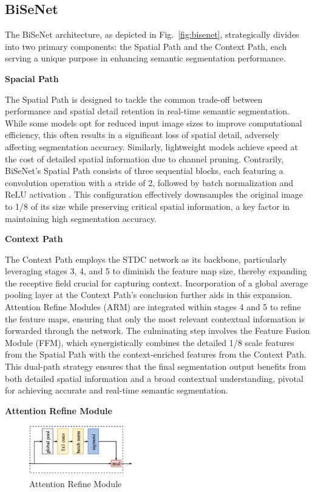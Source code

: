 \documentclass[conference]{IEEEtran}
\begin{document}
\subsection{BiSeNet}

The BiSeNet architecture, as depicted in Fig.~\ref{fig:bisenet}, strategically divides into two primary components: the Spatial Path and the Context Path, each serving a unique purpose in enhancing semantic segmentation performance.

\textbf{Spacial Path}

The Spatial Path is designed to tackle the common trade-off between performance and spatial detail retention in real-time semantic segmentation. While some models opt for reduced input image sizes to improve computational efficiency, this often results in a significant loss of spatial detail, adversely affecting segmentation accuracy. Similarly, lightweight models achieve speed at the cost of detailed spatial information due to channel pruning. Contrarily, BiSeNet's Spatial Path consists of three sequential blocks, each featuring a convolution operation with a stride of 2, followed by batch normalization and ReLU activation \cite{b9}. This configuration effectively downsamples the original image to 1/8 of its size while preserving critical spatial information, a key factor in maintaining high segmentation accuracy.

\textbf{Context Path}

The Context Path employs the STDC network as its backbone, particularly leveraging stages 3, 4, and 5 to diminish the feature map size, thereby expanding the receptive field crucial for capturing context. Incorporation of a global average pooling layer at the Context Path's conclusion further aids in this expansion. Attention Refine Modules (ARM) are integrated within stages 4 and 5 to refine the feature maps, ensuring that only the most relevant contextual information is forwarded through the network. The culminating step involves the Feature Fusion Module (FFM), which synergistically combines the detailed 1/8 scale features from the Spatial Path with the context-enriched features from the Context Path. This dual-path strategy ensures that the final segmentation output benefits from both detailed spatial information and a broad contextual understanding, pivotal for achieving accurate and real-time semantic segmentation.

\textbf{Attention Refine Module}
\begin{figure}[tp]
\centerline{\includegraphics[width=0.4\textwidth]{figures/ARM}}
\caption{Attention Refine Module}
\label{fig:arm}
\end{figure}
\end{document}

